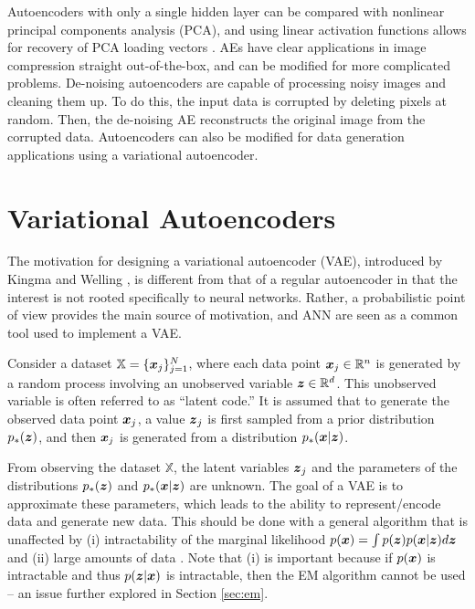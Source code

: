 Autoencoders with only a single hidden layer can be compared with nonlinear principal components analysis (PCA), and using linear activation functions allows for recovery of PCA loading vectors \cite{plaut2018}. AEs have clear applications in image compression straight out-of-the-box, and can be modified for more complicated problems. De-noising autoencoders \cite{vincent2008} are capable of processing noisy images and cleaning them up. To do this, the input data is corrupted by deleting pixels at random. Then, the de-noising AE reconstructs the original image from the corrupted data. Autoencoders can also be modified for data generation applications using a variational autoencoder.

\section{Variational Autoencoders}\label{sec:vae}

The motivation for designing a variational autoencoder (VAE), introduced by Kingma and Welling \cite{kingma2014}, is different from that of a regular autoencoder in that the interest is not rooted specifically to neural networks. Rather, a probabilistic point of view provides the main source of motivation, and ANN are seen as a common tool used to implement a VAE.

Consider a dataset $\mathbb{X} = \{\boldsymbol{x}_j\}_{j=1}^N$, where each data point $\boldsymbol{x}_j \in \mathbb{R}^n$ is generated by a random process involving an unobserved variable $\boldsymbol{z} \in \mathbb{R}^d$. This unobserved variable is often referred to as ``latent code.'' It is assumed that to generate the observed data point $\boldsymbol{x}_j$, a value $\boldsymbol{z}_j$ is first sampled from a prior distribution $p_*(\boldsymbol{z})$, and then $\boldsymbol{x}_j$ is generated from a distribution $p_*(\boldsymbol{x} | \boldsymbol{z})$.

From observing the dataset $\mathbb{X}$, the latent variables $\boldsymbol{z}_j$ and the parameters of the distributions $p_*(\boldsymbol{z})$ and $p_*(\boldsymbol{x} | \boldsymbol{z})$ are unknown. The goal of a VAE is to approximate these parameters, which leads to the ability to represent/encode data and generate new data. This should be done with a general algorithm that is unaffected by (i) intractability of the marginal likelihood $p(\boldsymbol{x}) = \int p(\boldsymbol{z}) p(\boldsymbol{x} | \boldsymbol{z}) d\boldsymbol{z}$ and (ii) large amounts of data \cite{kingma2014}. Note that (i) is important because if $p(\boldsymbol{x})$ is intractable and thus $p(\boldsymbol{z} | \boldsymbol{x})$ is intractable, then the EM algorithm cannot be used -- an issue further explored in Section \ref{sec:em}.

